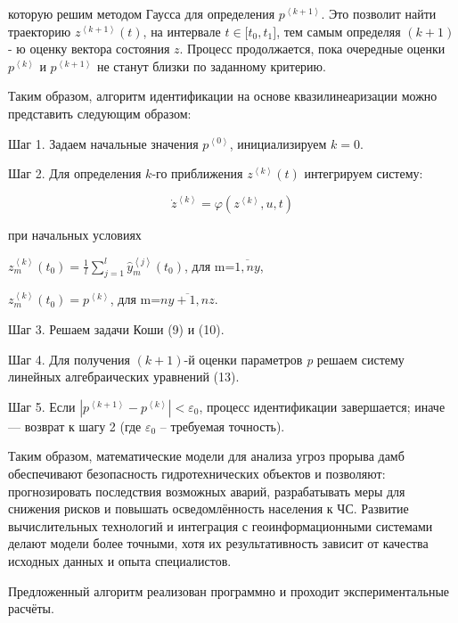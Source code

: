 которую решим методом Гаусса для определения
\(p^{\left\langle k + 1 \right\rangle}\). Это позволит найти траекторию
\(z^{\left\langle k + 1 \right\rangle}(t)\), на интервале
\(t \in \lbrack t_{0},t_{1}\rbrack\), тем самым определяя \((k + 1)\)- ю
оценку вектора состояния \(z\). Процесс продолжается, пока очередные
оценки \(p^{\left\langle k \right\rangle}\) и
\(p^{\left\langle k + 1 \right\rangle}\) не станут близки по заданному
критерию.

Таким образом, алгоритм идентификации на основе квазилинеаризации можно
представить следующим образом:

Шаг 1. Задаем начальные значения \(p^{\left\langle 0 \right\rangle}\),
инициализируем \(k = 0\).

Шаг 2. Для определения \(k\)-го приближения
\(z^{\left\langle k \right\rangle}(t)\) интегрируем систему:

\[{\dot{z}}^{\left\langle k \right\rangle} = \varphi(z^{\left\langle k \right\rangle},u,t)\]

при начальных условиях

\(z_{m}^{\left\langle k \right\rangle}\left( t_{0} \right) = \frac{1}{l}\sum_{j = 1}^{l}{{\widehat{y}}_{m}^{\left\langle j \right\rangle}(t_{0})}\),
для m=\(\overline{1,ny}\),

\(z_{m}^{\left\langle k \right\rangle}\left( t_{0} \right) = p^{\left\langle k \right\rangle}\),
для m=\(\overline{ny + 1,nz}\).

Шаг 3. Решаем задачи Коши (9) и (10).

Шаг 4. Для получения \((k + 1)\)-й оценки параметров \emph{p} решаем
систему линейных алгебраических уравнений (13).

Шаг 5. Если
\(\left| p^{\left\langle k + 1 \right\rangle} - p^{\left\langle k \right\rangle} \right| < \varepsilon_{0}\),
процесс идентификации завершается; иначе --- возврат к шагу 2 (где
\(\varepsilon_{0}\) -- требуемая точность).

Таким образом, математические модели для анализа угроз прорыва дамб
обеспечивают безопасность гидротехнических объектов и позволяют:
прогнозировать последствия возможных аварий, разрабатывать меры для
снижения рисков и повышать осведомлённость населения к ЧС. Развитие
вычислительных технологий и интеграция с геоинформационными системами
делают модели более точными, хотя их результативность зависит от
качества исходных данных и опыта специалистов.

Предложенный алгоритм реализован программно и проходит экспериментальные
расчёты.

